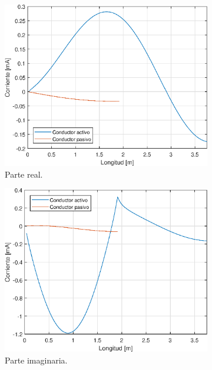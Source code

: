 \begin{figure}[H]
	\begin{subfigure}{0.5\textwidth}
		\includegraphics[scale=0.6]{imagenes/i_real_80_tierra.eps}
		\caption{Parte real.}
	\end{subfigure}
	\quad
	\begin{subfigure}{0.5\textwidth}
		\includegraphics[scale=0.6]{imagenes/i_imag_80_tierra.eps}
		\caption{Parte imaginaria.}
	\end{subfigure}
	\quad
	\begin{subfigure}{0.5\textwidth}

\end{subfigure}
\end{figure}
